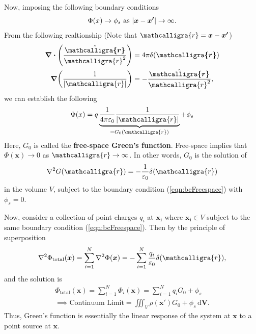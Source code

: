 \documentclass[12pt,english]{article}
\newcommand{\dmr}[1]{\, \mathrm{d}#1} %
\newcommand{\curly}[1]{\ensuremath{\mathcalligra{#1}}}
\let\oldhat\hat
\renewcommand{\vec}[1]{\boldsymbol{#1}}
\renewcommand{\hat}[1]{\oldhat{\boldsymbol{#1}}}
\begin{document}
Now, imposing the following boundary conditions
\begin{equation}
    \Phi(x) \to \phi_s \text{ as } \abs{\vec{x} - \vec{x'}} \to \infty. \label{eqn:bcFreespace}
\end{equation}
From the following realtionship (Note that $\curly{r} = \vec{x} - \vec{x'}$)
\begin{subequations}
    \begin{align}
        \div\left(\frac{\hat{\curly{r}}}{\curly{r}^2}\right) & = 4\pi\delta(\vec{\curly{r}})           \\
        \grad(\frac{1}{\abs{\curly{r}}})                     & = -\frac{\hat{\curly{r}}}{\curly{r}^2},
    \end{align}
\end{subequations}
we can establish the following
\begin{equation}
    \Phi(x) = q \underbrace{\frac{1}{4\pi\varepsilon_0}\frac{1}{\abs{\curly{r}}}}_{=G_0(\curly{r})} + \phi_s
\end{equation}
Here, $G_0$ is called the \textbf{free-space Green's function}. Free-space implies that $\Phi(\vec{x}) \to 0$ as $\curly{r} \to \infty$. In other words, $G_0$ is the solution of
\begin{equation}
    \laplacian G(\curly{r}) = -\frac{1}{\varepsilon_0} \delta(\curly{r}) \label{eqn:Gfn5}
\end{equation}
in the volume $V$, subject to the boundary condition (\ref{eqn:bcFreespace}) with $\phi_s = 0$.

Now, consider a collection of point charges $q_i$ at $\vec{x_i}$ where $\vec{x_i} \in V$ subject to the same boundary condition (\ref{eqn:bcFreespace}). Then by the principle of superposition
\begin{equation}
    \laplacian \Phi_{\text{total}}(\vec{x}) = \sum_{i = 1}^{N}\laplacian\Phi(\vec{x}) = - \sum_{i = 1}^{N} \frac{q_i}{\varepsilon_0} \delta(\curly{r}),
\end{equation}
and the solution is
\begin{subequations}
    \begin{align}
        \Phi_{\text{total}}(\vec{x}) = \sum_{i = 1}^{N} \Phi_i(\vec{x}) = \sum_{i = 1}^{N} q_i G_0 + \phi_s \\
        \implies \text{Continuum Limit} = \iiint_{V} \rho(\vec{x'}) G_0 + \phi_s \dmr{\vec{V}}.
    \end{align}
\end{subequations}
Thus, Green's function is essentially the linear response of the system at $\vec{x}$ to a point source at $\vec{x}$.
\end{document}
